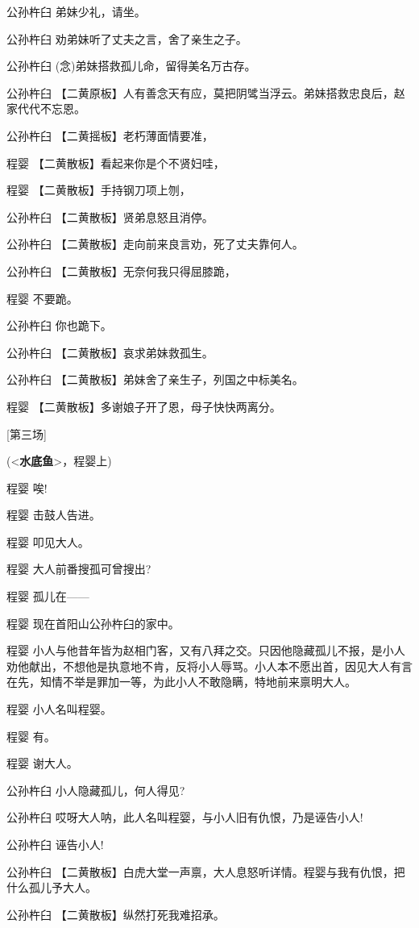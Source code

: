 公孙杵臼 弟妹少礼，请坐。

公孙杵臼 劝弟妹听了丈夫之言，舍了亲生之子。

公孙杵臼 (念)弟妹搭救孤儿命，留得美名万古存。

公孙杵臼
【二黄原板】人有善念天有应，莫把阴骘当浮云。弟妹搭救忠良后，赵家代代不忘恩。

公孙杵臼 【二黄摇板】老朽薄面情要准，

程婴 【二黄散板】看起来你是个不贤妇哇，

程婴 【二黄散板】手持钢刀项上刎，

公孙杵臼 【二黄散板】贤弟息怒且消停。

公孙杵臼 【二黄散板】走向前来良言劝，死了丈夫靠何人。

公孙杵臼 【二黄散板】无奈何我只得屈膝跪，

程婴 不要跪。

公孙杵臼 你也跪下。

公孙杵臼 【二黄散板】哀求弟妹救孤生。

公孙杵臼 【二黄散板】弟妹舍了亲生子，列国之中标美名。

程婴 【二黄散板】多谢娘子开了恩，母子快快两离分。

{[}第三场{]}

(\textless{}\textbf{水底鱼}\textgreater{}，程婴上)

程婴 唉!

程婴 击鼓人告进。

程婴 叩见大人。

程婴 大人前番搜孤可曾搜出?

程婴 孤儿在------

程婴 现在首阳山公孙杵臼的家中。

程婴
小人与他昔年皆为赵相门客，又有八拜之交。只因他隐藏孤儿不报，是小人劝他献出，不想他是执意地不肯，反将小人辱骂。小人本不愿出首，因见大人有言在先，知情不举是罪加一等，为此小人不敢隐瞒，特地前来禀明大人。

程婴 小人名叫程婴。

程婴 有。

程婴 谢大人。

公孙杵臼 小人隐藏孤儿，何人得见?

公孙杵臼 哎呀大人呐，此人名叫程婴，与小人旧有仇恨，乃是诬告小人!

公孙杵臼 诬告小人!

公孙杵臼
【二黄散板】白虎大堂一声禀，大人息怒听详情。程婴与我有仇恨，把什么孤儿予大人。

公孙杵臼 【二黄散板】纵然打死我难招承。

